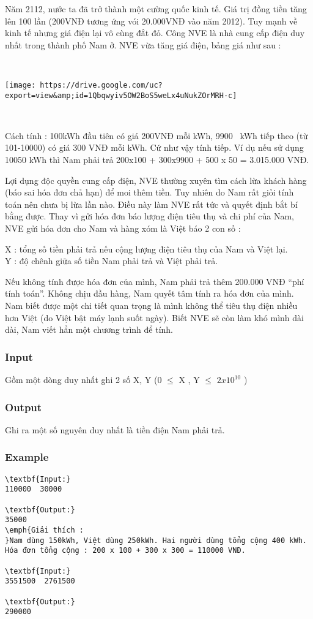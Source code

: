 

Năm 2112, nước ta đã trở thành một cường quốc kinh tế. Giá trị đồng tiền tăng lên 100 lần (200VNĐ tương ứng vói 20.000VNĐ vào năm 2012). Tuy mạnh về kinh tế nhưng giá điện lại vô cùng đắt đỏ. Công NVE là nhà cung cấp điện duy nhất trong thành phố Nam ở. NVE vừa tăng giá điện, bảng giá như sau :

 


\texttt{[image: https://drive.google.com/uc?export=view\&amp;id=1Qbqwyiv5OW2BoS5weLx4uNukZOrMRH-c]}

 

Cách tính : 100kWh đầu tiên có giá 200VNĐ mỗi kWh, 9900  kWh tiếp theo (từ 101-10000) có giá 300 VNĐ mỗi kWh. Cứ như vậy tính tiếp. Ví dụ nếu sử dụng 10050 kWh thì Nam phải trả 200x100 + 300x9900 + 500 x 50 = 3.015.000 VNĐ.

Lợi dụng độc quyền cung cấp điện, NVE thường xuyên tìm cách lừa khách hàng (báo sai hóa đơn chả hạn) để moi thêm tiền. Tuy nhiên do Nam rất giỏi tính toán nên chưa bị lừa lần nào. Điều này làm NVE rất tức và quyết định bắt bí bằng được. Thay vì gửi hóa đơn báo lượng điện tiêu thụ và chi phí của Nam, NVE gửi hóa đơn cho Nam và hàng xóm là Việt báo 2 con số :

X : tổng số tiền phải trả nếu cộng lượng điện tiêu thụ của Nam và Việt lại.
\\Y : độ chênh giữa số tiền Nam phải trả và Việt phải trả.

Nếu không tính được hóa đơn của mình, Nam phải trả thêm 200.000 VNĐ “phí tính toán”. Không chịu đầu hàng, Nam quyết tâm tính ra hóa đơn của mình. Nam biết được một chi tiết quan trọng là mình không thể tiêu thụ điện nhiều hơn Việt (do Việt bật máy lạnh suốt ngày). Biết NVE sẽ còn làm khó mình dài dài, Nam viết hẳn một chương trình để tính.

\subsubsection{Input}

Gồm một dòng duy nhất ghi 2 số X, Y (0  $\le$  X , Y $\le$  $2x10^{10}$ )

\subsubsection{Output}

Ghi ra một số nguyên duy nhất là tiền điện Nam phải trả.

\subsubsection{Example}
\begin{verbatim}
\textbf{Input:}
110000  30000

\textbf{Output:}
35000
\emph{Giải thích : 
}Nam dùng 150kWh, Việt dùng 250kWh. Hai người dùng tổng cộng 400 kWh. 
Hóa đơn tổng cộng : 200 x 100 + 300 x 300 = 110000 VNĐ.

\textbf{Input:}
3551500  2761500

\textbf{Output:}
290000

\end{verbatim}


